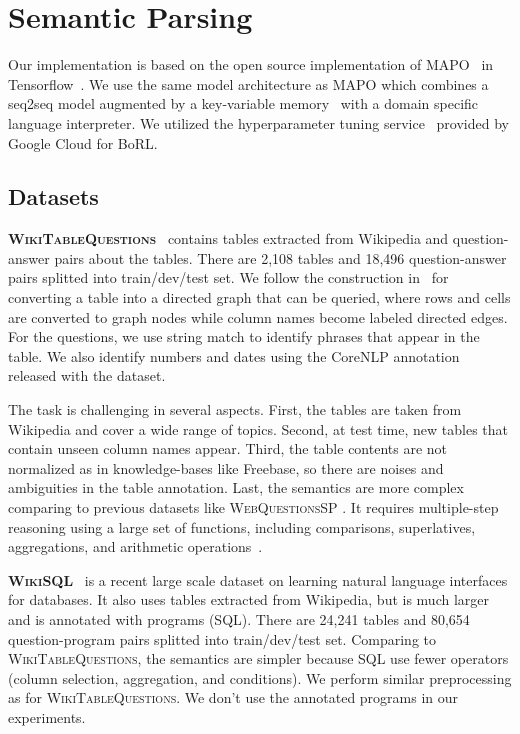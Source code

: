 \section{Semantic Parsing}
\label{sup:semantic}

Our implementation is based on the open source implementation of MAPO~\cite{NIPS2018_8204} in
Tensorflow~\cite{abadi2016tensorflow}. We use the same model
architecture as MAPO which combines a seq2seq model augmented by a
key-variable memory~\cite{liang2017nsm} with a domain specific
language interpreter. We utilized the hyperparameter tuning
service~\cite{golovin2017google} provided by Google Cloud for BoRL.

\subsection{Datasets}

{\bf \textsc{WikiTableQuestions}}~\cite{pasupat2015tables} contains tables extracted from Wikipedia and question-answer pairs about the tables. There are 2,108 tables and 18,496 question-answer pairs splitted into train/dev/test set. We follow the construction in~\cite{pasupat2015tables} for converting a table into a directed graph that can be queried, where rows and cells are converted to graph nodes while column names become labeled directed edges. For the questions, we use string match to identify phrases that appear in the table. We also identify numbers and dates using the CoreNLP annotation released with the dataset.

The task is challenging in several aspects.
First, the tables are taken from Wikipedia and cover a wide range of topics.
Second, at test time, new tables that contain  unseen column names appear.
Third, the table contents are not normalized as in knowledge-bases like Freebase, so there are noises and ambiguities in the table annotation.
Last, the semantics are more complex comparing to previous datasets like \textsc{WebQuestionsSP} \cite{yih2016webquestionssp}.
It requires multiple-step reasoning using a large set of functions, including comparisons, superlatives, aggregations, and arithmetic operations~\cite{pasupat2015tables}.

{\bf \textsc{WikiSQL}}~\cite{zhong2017seq2sql} is a recent large scale dataset on learning natural language interfaces for databases. It also uses tables extracted from Wikipedia, but is much larger and is annotated with programs (SQL). There are 24,241 tables and 80,654 question-program pairs splitted into train/dev/test set. Comparing to \textsc{WikiTableQuestions}, the semantics are simpler because SQL use fewer operators (column selection, aggregation, and conditions). We perform similar preprocessing as for \textsc{WikiTableQuestions}. We don't use the annotated programs in our experiments.

